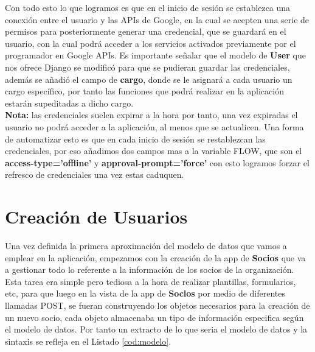 Con todo esto lo que logramos es que en el inicio de sesión se establezca una conexión entre el usuario y las APIs de Google, en la cual se acepten una serie de permisos para posteriormente generar una credencial,
que se guardará en el usuario, con la cual podrá acceder a los servicios activados previamente por el programador en Google APIs. Es importante señalar que el modelo de \textbf{User} que nos ofrece Django se modificó para que
se pudieran guardar las credenciales, además se añadió el campo de \textbf{cargo}, donde se le asignará a cada usuario un cargo específico, por tanto las funciones que podrá realizar en la aplicación estarán supeditadas a dicho cargo.\\

\textbf{Nota:} las credenciales suelen expirar a la hora por tanto, una vez expiradas el usuario no podrá acceder a la aplicación, al menos que se actualicen. Una forma de automatizar esto es que en cada inicio de sesión
se restablezcan las credenciales, por eso añadimos dos campos mas a la variable FLOW, que son el \textbf{access-type='offline'} y \textbf{approval-prompt='force'} con esto logramos forzar el refresco de
credenciales una vez estas caduquen.


\section{Creación de Usuarios}
\label{4:sec5}

Una vez definida la primera aproximación del modelo de datos que vamos a emplear en la aplicación, empezamos con la creación de la app de \textbf{Socios} que va a gestionar todo lo referente a la información de los socios de 
la organización.\\

Esta tarea era simple pero tediosa a la hora de realizar plantillas, formularios, etc, para que luego en la vista de la app de \textbf{Socios} por medio de diferentes llamadas POST, se fueran construyendo los objetos necesarios
para la creación de un nuevo socio, cada objeto almacenaba un tipo de información especifica según el modelo de datos. Por tanto un extracto de lo que seria el modelo de datos y la sintaxis se refleja en el Listado \ref{cod:modelo}.\\



\bigskip

